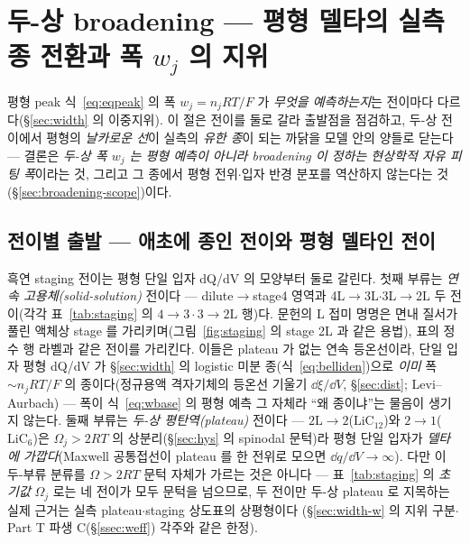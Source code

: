 \section{두-상 broadening --- 평형 델타의 실측 종 전환과 폭 $w_j$ 의 지위}\label{sec:broadening}
평형 peak 식~\eqref{eq:eqpeak} 의 폭 $w_j=n_jRT/F$ 가 \emph{무엇을 예측하는지}는 전이마다 다르다(\S\ref{sec:width}
의 이중지위). 이 절은
전이를 둘로 갈라 출발점을 점검하고, 두-상 전이에서 평형의 \emph{날카로운 선}이 실측의 \emph{유한 종}이 되는
까닭을 모델 안의 양들로 닫는다 --- 결론은 \emph{두-상 폭 $w_j$ 는 평형 예측이 아니라 broadening 이 정하는
현상학적 자유 피팅 폭}이라는 것, 그리고 그 종에서 평형 전위$\cdot$입자 반경 분포를 역산하지 않는다는
것(\S\ref{sec:broadening-scope})이다.

\subsection{전이별 출발 --- 애초에 종인 전이와 평형 델타인 전이}\label{sec:broadening-class}
흑연 staging 전이는 평형 단일 입자 dQ/dV 의 모양부터
둘로 갈린다. 첫째 부류는 \emph{연속 고용체(solid-solution)} 전이다 --- dilute$\to$stage4 영역과
4L$\to$3L$\cdot$3L$\to$2L 두 전이(각각 표~\ref{tab:staging} 의 $4\!\to\!3\cdot3\!\to\!2\mathrm L$ 행)다. 문헌의 L 접미 명명은 면내 질서가 풀린
액체상 stage 를 가리키며(그림~\ref{fig:staging} 의 stage 2L 과 같은 용법), 표의 정수 행 라벨과 같은 전이를
가리킨다. 이들은 plateau 가 없는 연속 등온선이라\cite{rsc2021}, 단일 입자 평형 dQ/dV 가 \S\ref{sec:width} 의 logistic 미분
종(식~\eqref{eq:belliden})으로 \emph{이미} 폭 $\sim n_jRT/F$ 의 종이다(정규용액 격자기체의 등온선 기울기
$\dd\xi/\dd V$, \S\ref{sec:dist}; Levi--Aurbach\cite{leviaurbach1999}) --- 폭이 식~\eqref{eq:wbase} 의 평형
예측 그 자체라 ``왜 종이냐''는 물음이 생기지 않는다. 둘째 부류는 \emph{두-상 평탄역(plateau)} 전이다 ---
$2\mathrm L\!\to\!2$($\mathrm{LiC_{12}}$)와 $2\!\to\!1$($\mathrm{LiC_6}$)은 $\Omega_j>2RT$ 의 상분리(\S\ref{sec:hys}
의 spinodal 문턱)라 평형 단일 입자가 \emph{델타에 가깝다}(Maxwell 공통접선이 plateau 를 한 전위로 모으면
$\dd q/\dd V\!\to\!\infty$). 다만 이 두-부류 분류를 $\Omega>2RT$ 문턱 자체가 가르는 것은 아니다 ---
표~\ref{tab:staging} 의 \emph{초기값} $\Omega_j$ 로는 네 전이가 모두 문턱을 넘으므로, 두 전이만 두-상
plateau 로 지목하는 실제 근거는 실측 plateau$\cdot$staging 상도표의 상평형이다\cite{dahn1991,ohzuku1993}
(\S\ref{sec:width-w} 의 지위 구분$\cdot$Part T 파생 C(\S\ref{ssec:weff}) 각주와 같은 한정).


